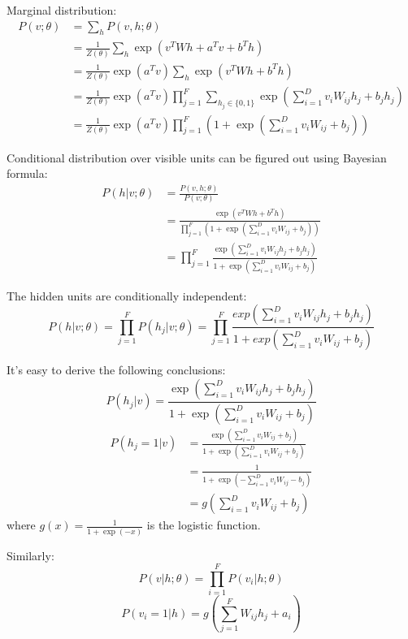 \documentclass{beamer}
\begin{document}
\begin{CJK*}{UTF8}{gbsn}
\begin{frame}[allowframebreaks]
Marginal distribution:
\begin{equation}
\begin{split}
P(v;\theta)&=\sum_hP(v,h;\theta)\\
&=\frac{1}{Z(\theta)}\sum_h \exp(v^TWh+a^Tv+b^Th)\\
&=\frac{1}{Z(\theta)}\exp(a^Tv)\sum_h \exp(v^TWh+b^Th)\\
&=\frac{1}{Z(\theta)}\exp(a^Tv)\prod_{j=1}^F\sum_{h_j\in\{0,1\}}\exp(\sum_{i=1}^Dv_iW_{ij}h_j+b_jh_j)\\
&=\frac{1}{Z(\theta)}\exp(a^Tv)\prod_{j=1}^F(1+\exp(\sum_{i=1}^Dv_iW_{ij}+b_j))
\end{split}
\end{equation}

Conditional distribution over visible units can be figured out using Bayesian formula:
\begin{equation}
\begin{split}
P(h|v;\theta)&=\frac{P(v,h;\theta)}{P(v;\theta)}\\
&=\frac{\exp(v^TWh+b^Th)}{\prod_{j=1}^F(1+\exp(\sum_{i=1}^Dv_iW_{ij}+b_j))}\\
&=\prod_{j=1}^F\frac{\exp(\sum_{i=1}^Dv_iW_{ij}h_j+b_jh_j)}{1+\exp(\sum_{i=1}^Dv_iW_{ij}+b_j)}
\end{split}
\end{equation}

The hidden units are conditionally independent:
\begin{equation}
P(h|v;\theta)=\prod_{j=1}^FP(h_j|v;\theta)=\prod_{j=1}^F\frac{exp(\sum_{i=1}^Dv_iW_{ij}h_j+b_jh_j)}{1+exp(\sum_{i=1}^Dv_iW_{ij}+b_j)}
\end{equation}

It's easy to derive the following conclusions:
\begin{equation}
P(h_j|v)=\frac{\exp(\sum_{i=1}^Dv_iW_{ij}h_j+b_jh_j)}{1+\exp(\sum_{i=1}^Dv_iW_{ij}+b_j)}
\end{equation}
\begin{equation}
\begin{split}
P(h_j=1|v)&=\frac{\exp(\sum_{i=1}^Dv_iW_{ij}+b_j)}{1+\exp(\sum_{i=1}^Dv_iW_{ij}+b_j)}\\
&=\frac{1}{1+\exp(-\sum_{i=1}^Dv_iW_{ij}-b_j)}\\
&=g(\sum_{i=1}^Dv_iW_{ij}+b_j)
\end{split}
\end{equation}
where $g(x)=\frac{1}{1+\exp(-x)}$ is the logistic function.

Similarly:
\begin{equation}
P(v|h;\theta)=\prod_{i=1}^FP(v_i|h;\theta)
\end{equation}
\begin{equation}
P(v_i=1|h)=g(\sum_{j=1}^FW_{ij}h_j+a_i)
\end{equation}


\end{frame}
\end{CJK*}
\end{document}
